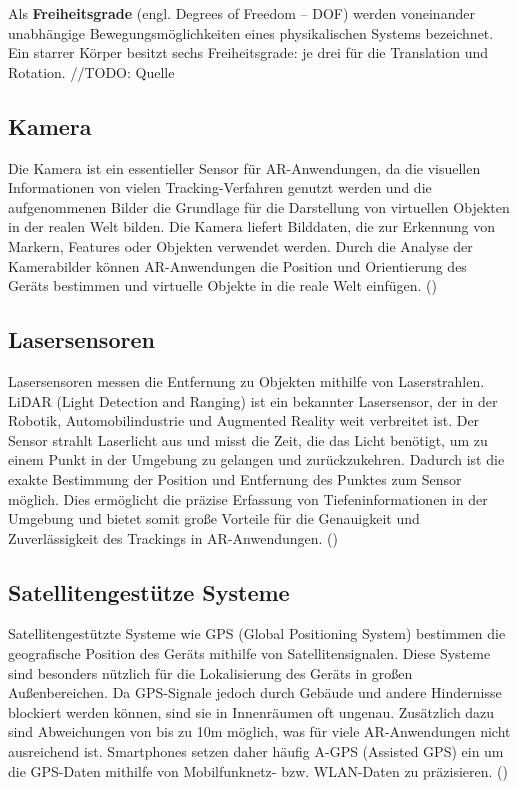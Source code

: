\begin{tcolorbox}[colback=THAi-Blue!20!white, colframe=THAi-Blue]
    Als \textbf{Freiheitsgrade} (engl. Degrees of Freedom – DOF) werden voneinander unabhängige Bewegungsmöglichkeiten eines physikalischen Systems bezeichnet. Ein starrer Körper besitzt sechs Freiheitsgrade: je drei für die Translation und Rotation. //TODO: Quelle
\end{tcolorbox}
    

\subsection{Kamera}

Die Kamera ist ein essentieller Sensor für AR-Anwendungen, da die visuellen Informationen von vielen Tracking-Verfahren genutzt werden und die aufgenommenen Bilder die Grundlage für die Darstellung von virtuellen Objekten in der realen Welt bilden. Die Kamera liefert Bilddaten, die zur Erkennung von Markern, Features oder Objekten verwendet werden. Durch die Analyse der Kamerabilder können AR-Anwendungen die Position und Orientierung des Geräts bestimmen und virtuelle Objekte in die reale Welt einfügen. (\cite{doerner2022virtual})

\subsection{Lasersensoren}\label{LiDAR}

Lasersensoren messen die Entfernung zu Objekten mithilfe von Laserstrahlen. LiDAR (Light Detection and Ranging) ist ein bekannter Lasersensor, der in der Robotik, Automobilindustrie und Augmented Reality weit verbreitet ist. Der Sensor strahlt Laserlicht aus und misst die Zeit, die das Licht benötigt, um zu einem Punkt in der Umgebung zu gelangen und zurückzukehren. Dadurch ist die exakte Bestimmung der Position und Entfernung des Punktes zum Sensor möglich. Dies ermöglicht die präzise Erfassung von Tiefeninformationen in der Umgebung und bietet somit große Vorteile für die Genauigkeit und Zuverlässigkeit des Trackings in AR-Anwendungen. (\cite{doerner2022virtual})

\subsection{Satellitengestütze Systeme}

Satellitengestützte Systeme wie GPS (Global Positioning System) bestimmen die geografische Position des Geräts mithilfe von Satellitensignalen. Diese Systeme sind besonders nützlich für die Lokalisierung des Geräts in großen Außenbereichen. Da GPS-Signale jedoch durch Gebäude und andere Hindernisse blockiert werden können, sind sie in Innenräumen oft ungenau. Zusätzlich dazu sind Abweichungen von bis zu 10m möglich, was für viele AR-Anwendungen nicht ausreichend ist. Smartphones setzen daher häufig A-GPS (Assisted GPS) ein um die GPS-Daten mithilfe von Mobilfunknetz- bzw. WLAN-Daten zu präzisieren. (\cite{doerner2022virtual}) 

